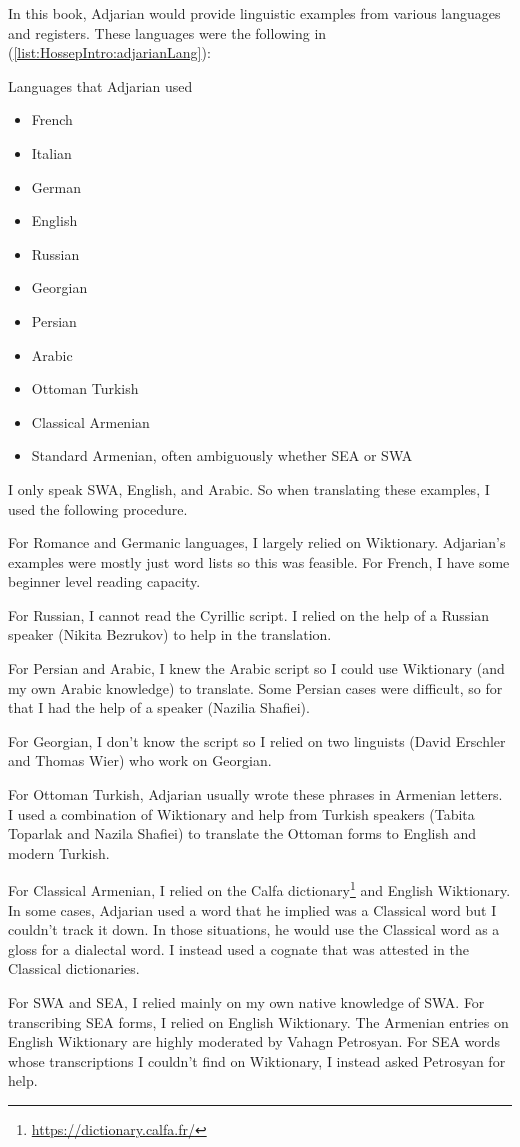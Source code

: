In this book, Adjarian would provide linguistic examples from various languages and registers. These languages were the following in (\ref{list:HossepIntro:adjarianLang}):  

\begin{exe}
	\ex Languages that Adjarian used \label{list:HossepIntro:adjarianLang}
	\begin{itemize}
		 \item French
\item Italian
\item German
\item English
		 \item Russian
		 \item Georgian
		 \item Persian
\item Arabic
		 \item Ottoman Turkish
		 \item Classical Armenian
		 \item Standard Armenian, often ambiguously whether SEA or SWA
		\end{itemize}
\end{exe}

I only speak SWA, English, and Arabic. So when translating these examples, I used the following procedure. 

For Romance and Germanic languages, I largely relied on Wiktionary. Adjarian's examples were mostly just word lists so this was feasible. For French, I have some beginner level reading capacity. 

For Russian, I cannot read the Cyrillic script. I relied on the help of  a Russian speaker (Nikita Bezrukov) to help in the translation. 

For Persian and Arabic, I knew the Arabic script so I could use Wiktionary (and my own Arabic knowledge) to translate. Some Persian cases were difficult, so for that I had the help of a speaker (Nazilia Shafiei). 

For Georgian, I don't know the script so I relied on two linguists (David Erschler and Thomas Wier) who work on Georgian. 

For Ottoman Turkish, Adjarian usually wrote these phrases in Armenian letters. I used a combination of Wiktionary and help from Turkish speakers (Tabita Toparlak and Nazila Shafiei) to translate the Ottoman forms to English and modern Turkish. 

For Classical Armenian, I relied on the Calfa dictionary\footnote{\url{https://dictionary.calfa.fr/}} and English Wiktionary. In some cases, Adjarian used a word that he implied was a Classical word but I couldn't track it down. In those situations, he would use the Classical word as a gloss for a  dialectal word. I instead used a cognate that was attested in the Classical dictionaries. 

For SWA and SEA, I relied mainly on my own native knowledge of SWA. For transcribing SEA forms, I relied on English Wiktionary. The Armenian entries on English Wiktionary are highly moderated by Vahagn Petrosyan. For SEA words whose transcriptions I couldn't find on Wiktionary, I instead asked Petrosyan for help. 



